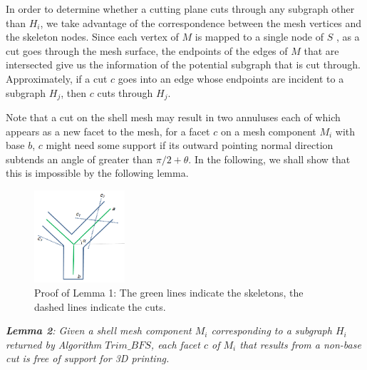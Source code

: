 {In order to determine whether a cutting plane cuts through any subgraph other than $H_i$, we take advantage of the correspondence between the mesh vertices and the skeleton nodes. Since each vertex of $M$ is mapped to a single node of $S$ \cite{AuTCCL08}, as a cut goes through the mesh surface, the endpoints of the edges of $M$ that are intersected give us the information of the potential subgraph that is cut through. Approximately, if a cut $c$ goes into an edge whose endpoints are incident to a subgraph $H_j$, then $c$ cuts through $H_j$.


{{Note that a cut on the shell mesh may result in two annuluses each of which appears as a new facet to the mesh, for a facet $c$ on a mesh component $M_i$ with base $b$, $c$ might need some support if its outward pointing normal direction subtends an angle of greater than $\pi/2 + \theta$. In the following, we shall show that this is impossible by the following lemma.

\begin{figure}[b]
  \centering
  \includegraphics[width=0.3\textwidth]{figs/nonbasecut.png}
  \caption{\label{fig:nonbasecut}%
           Proof of Lemma 1: The green lines indicate the skeletons, the dashed lines indicate the cuts.}
\end{figure}


\emph{\textbf{Lemma 2}: Given a shell mesh component $M_i$ corresponding to a subgraph $H_i$ returned by Algorithm $Trim\_BFS$, each facet $c$ of $M_i$ that results from a non-base cut is free of support for 3D printing.}

}}}
